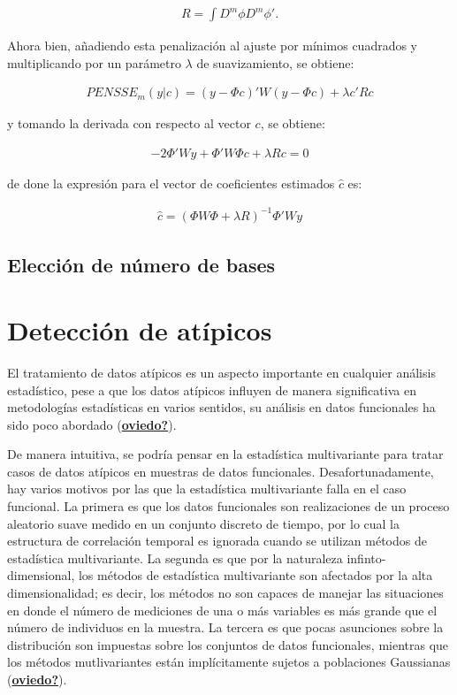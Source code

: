 \documentclass[
]{book}
\begin{document}
\begin{align}
    R=\int D^m \phi D^m\phi'.
\end{align}

Ahora bien, añadiendo esta penalización al ajuste por mínimos cuadrados y multiplicando por un parámetro \(\lambda\) de suavizamiento, se obtiene:

\begin{align}
    PENSSE_m(y|c)=(y-\Phi c)'W(y-\Phi c)+\lambda c'Rc
\end{align}

y tomando la derivada con respecto al vector \(c\), se obtiene:

\begin{align}
    -2\Phi'Wy + \Phi' W \Phi c + \lambda R c=0
\end{align}

de done la expresión para el vector de coeficientes estimados \({\hat{c}}\) es:

\begin{align}
    {\hat{c}}=(\Phi W \Phi + \lambda R)^{-1} \Phi' Wy
\end{align}

\hypertarget{elecciuxf3n-de-nuxfamero-de-bases}{%
\subsection{Elección de número de bases}\label{elecciuxf3n-de-nuxfamero-de-bases}}

\hypertarget{detecciuxf3n-de-atuxedpicos}{%
\section{Detección de atípicos}\label{detecciuxf3n-de-atuxedpicos}}

El tratamiento de datos atípicos es un aspecto importante en cualquier análisis estadístico, pese a que los datos atípicos influyen de manera significativa en metodologías estadísticas en varios sentidos, su análisis en datos funcionales ha sido poco abordado (\protect\hyperlink{ref-oviedo}{\textbf{oviedo?}}).

De manera intuitiva, se podría pensar en la estadística multivariante para tratar casos de datos atípicos en muestras de datos funcionales. Desafortunadamente, hay varios motivos por las que la estadística multivariante falla en el caso funcional. La primera es que los datos funcionales son realizaciones de un proceso aleatorio suave medido en un conjunto discreto de tiempo, por lo cual la estructura de correlación temporal es ignorada cuando se utilizan métodos de estadística multivariante. La segunda es que por la naturaleza infinto-dimensional, los métodos de estadística multivariante son afectados por la alta dimensionalidad; es decir, los métodos no son capaces de manejar las situaciones en donde el número de mediciones de una o más variables es más grande que el número de individuos en la muestra. La tercera es que pocas asunciones sobre la distribución son impuestas sobre los conjuntos de datos funcionales, mientras que los métodos mutlivariantes están implícitamente sujetos a poblaciones Gaussianas (\protect\hyperlink{ref-oviedo}{\textbf{oviedo?}}).
\end{document}
